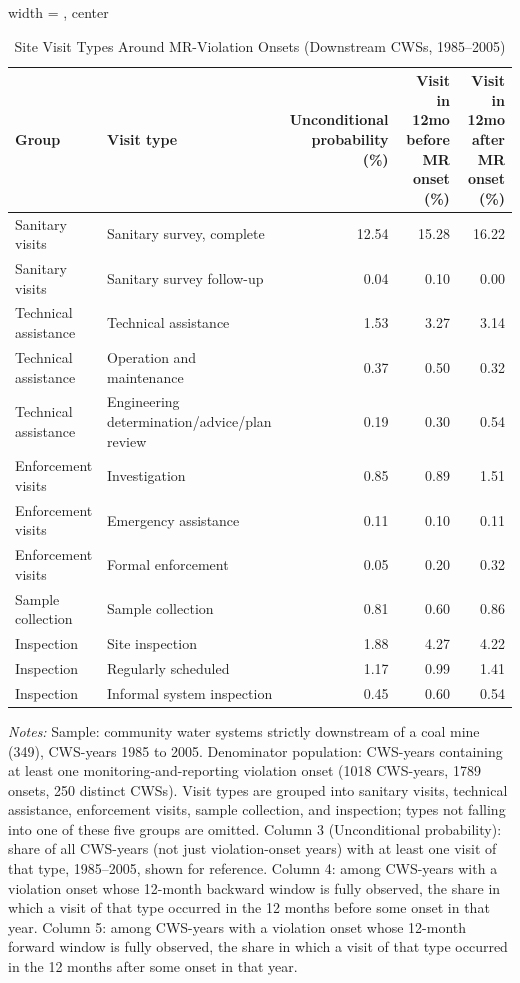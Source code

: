 \begin{table}[htbp]
\caption{\label{tab:visit_type_summary} Site Visit Types Around MR-Violation Onsets (Downstream CWSs, 1985--2005)}
\bigskip
\centering
\begin{adjustbox}{width = \textwidth, center}
\begin{tabular}{llrrr}
\toprule
Group & Visit type & Unconditional probability (\%) & Visit in 12mo before MR onset (\%) & Visit in 12mo after MR onset (\%) \\
\midrule
Sanitary visits & Sanitary survey, complete & 12.54 & 15.28 & 16.22 \\
Sanitary visits & Sanitary survey follow-up & 0.04 & 0.10 & 0.00 \\
Technical assistance & Technical assistance & 1.53 & 3.27 & 3.14 \\
Technical assistance & Operation and maintenance & 0.37 & 0.50 & 0.32 \\
Technical assistance & Engineering determination/advice/plan review & 0.19 & 0.30 & 0.54 \\
Enforcement visits & Investigation & 0.85 & 0.89 & 1.51 \\
Enforcement visits & Emergency assistance & 0.11 & 0.10 & 0.11 \\
Enforcement visits & Formal enforcement & 0.05 & 0.20 & 0.32 \\
Sample collection & Sample collection & 0.81 & 0.60 & 0.86 \\
Inspection & Site inspection & 1.88 & 4.27 & 4.22 \\
Inspection & Regularly scheduled & 1.17 & 0.99 & 1.41 \\
Inspection & Informal system inspection & 0.45 & 0.60 & 0.54 \\
\bottomrule
\end{tabular}
\end{adjustbox}
{\tiny\linespread{1}\selectfont \par \raggedright 
\textit{Notes:} Sample: community water systems strictly downstream of a coal mine (349), CWS-years 1985 to 2005. Denominator population: CWS-years containing at least one monitoring-and-reporting violation onset (1018 CWS-years, 1789 onsets, 250 distinct CWSs). Visit types are grouped into sanitary visits, technical assistance, enforcement visits, sample collection, and inspection; types not falling into one of these five groups are omitted. Column 3 (Unconditional probability): share of all CWS-years (not just violation-onset years) with at least one visit of that type, 1985--2005, shown for reference. Column 4: among CWS-years with a violation onset whose 12-month backward window is fully observed, the share in which a visit of that type occurred in the 12 months before some onset in that year. Column 5: among CWS-years with a violation onset whose 12-month forward window is fully observed, the share in which a visit of that type occurred in the 12 months after some onset in that year.
}
\end{table}
